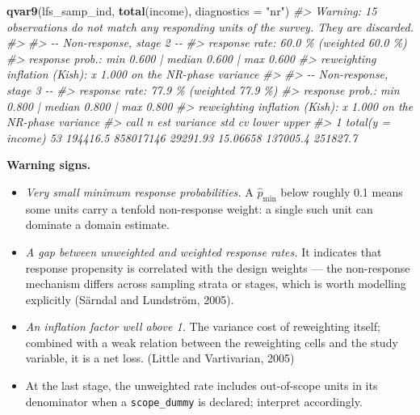 \documentclass[
]{article}
\newenvironment{Shaded}{\begin{snugshade}}{\end{snugshade}}
\newcommand{\AttributeTok}[1]{\textcolor[rgb]{0.13,0.29,0.53}{#1}}
\newcommand{\CommentTok}[1]{\textcolor[rgb]{0.56,0.35,0.01}{\textit{#1}}}
\newcommand{\FunctionTok}[1]{\textcolor[rgb]{0.13,0.29,0.53}{\textbf{#1}}}
\newcommand{\NormalTok}[1]{#1}
\newcommand{\StringTok}[1]{\textcolor[rgb]{0.31,0.60,0.02}{#1}}
\providecommand{\tightlist}{%
  \setlength{\itemsep}{0pt}\setlength{\parskip}{0pt}}
\begin{document}
\begin{Shaded}
\begin{Highlighting}[]
\FunctionTok{qvar9}\NormalTok{(lfs\_samp\_ind, }\FunctionTok{total}\NormalTok{(income), }\AttributeTok{diagnostics =} \StringTok{"nr"}\NormalTok{)}
\CommentTok{\#\textgreater{} Warning: 15 observations do not match any responding units of the survey. They are discarded.}
\CommentTok{\#\textgreater{} }
\CommentTok{\#\textgreater{} {-}{-} Non{-}response, stage 2 {-}{-}}
\CommentTok{\#\textgreater{}   response rate: 60.0 \% (weighted 60.0 \%)}
\CommentTok{\#\textgreater{}   response prob.: min 0.600 | median 0.600 | max 0.600}
\CommentTok{\#\textgreater{}   reweighting inflation (Kish): x 1.000 on the NR{-}phase variance}
\CommentTok{\#\textgreater{} }
\CommentTok{\#\textgreater{} {-}{-} Non{-}response, stage 3 {-}{-}}
\CommentTok{\#\textgreater{}   response rate: 77.9 \% (weighted 77.9 \%)}
\CommentTok{\#\textgreater{}   response prob.: min 0.800 | median 0.800 | max 0.800}
\CommentTok{\#\textgreater{}   reweighting inflation (Kish): x 1.000 on the NR{-}phase variance}
\CommentTok{\#\textgreater{}                call  n      est  variance      std       cv    lower    upper}
\CommentTok{\#\textgreater{} 1 total(y = income) 53 194416.5 858017146 29291.93 15.06658 137005.4 251827.7}
\end{Highlighting}
\end{Shaded}

\textbf{Warning signs.}

\begin{itemize}
\tightlist
\item
  \emph{Very small minimum response probabilities.} A \(\hat p_{\min}\)
  below roughly 0.1 means some units carry a tenfold non-response
  weight: a single such unit can dominate a domain estimate.
\item
  \emph{A gap between unweighted and weighted response rates.} It
  indicates that response propensity is correlated with the design
  weights --- the non-response mechanism differs across sampling strata
  or stages, which is worth modelling explicitly (Särndal and Lundström,
  2005).
\item
  \emph{An inflation factor well above 1.} The variance cost of
  reweighting itself; combined with a weak relation between the
  reweighting cells and the study variable, it is a net loss. (Little
  and Vartivarian, 2005)
\item
  At the last stage, the unweighted rate includes out-of-scope units in
  its denominator when a \texttt{scope\_dummy} is declared; interpret
  accordingly.
\end{itemize}
\end{document}
